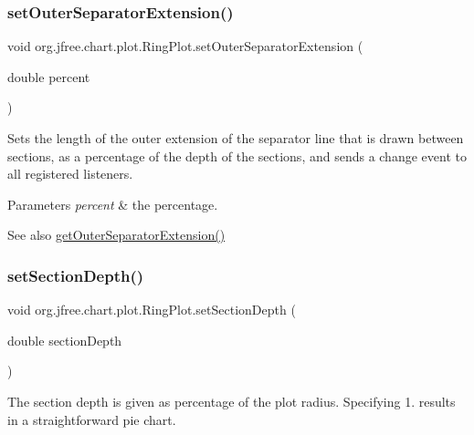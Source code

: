 \subsubsection{\texorpdfstring{set\+Outer\+Separator\+Extension()}{setOuterSeparatorExtension()}}
{\footnotesize\ttfamily void org.\+jfree.\+chart.\+plot.\+Ring\+Plot.\+set\+Outer\+Separator\+Extension (\begin{DoxyParamCaption}\item[{double}]{percent }\end{DoxyParamCaption})}

Sets the length of the outer extension of the separator line that is drawn between sections, as a percentage of the depth of the sections, and sends a change event to all registered listeners.


\begin{DoxyParams}{Parameters}
{\em percent} & the percentage.\\
\hline
\end{DoxyParams}
\begin{DoxySeeAlso}{See also}
\mbox{\hyperlink{classorg_1_1jfree_1_1chart_1_1plot_1_1_ring_plot_a98c30bad9e360b42056a9614fa04de17}{get\+Outer\+Separator\+Extension()}} 
\end{DoxySeeAlso}
\mbox{\label{classorg_1_1jfree_1_1chart_1_1plot_1_1_ring_plot_a067bff0789b2865b27801dd7e22befd8}} 
\subsubsection{\texorpdfstring{set\+Section\+Depth()}{setSectionDepth()}}
{\footnotesize\ttfamily void org.\+jfree.\+chart.\+plot.\+Ring\+Plot.\+set\+Section\+Depth (\begin{DoxyParamCaption}\item[{double}]{section\+Depth }\end{DoxyParamCaption})}

The section depth is given as percentage of the plot radius. Specifying 1. results in a straightforward pie chart.



